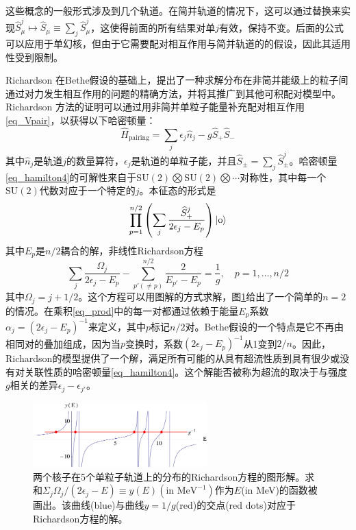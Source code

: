 这些概念的一般形式涉及到几个轨道。在简并轨道的情况下，这可以通过替换来实现$\widehat{S}_\mu^j\mapsto\widehat{S}_\mu\equiv\sum_j\widehat{S}^j_\mu$，这使得前面的所有结果对单$j$有效，保持不变。后面的公式可以应用于单幻核，但由于它需要配对相互作用与简并轨道的的假设，因此其适用性受到限制。

Richardson 在Bethe假设的基础上，提出了一种求解分布在非简并能级上的粒子间通过对力发生相互作用的问题的精确方法，并将其推广到其他可积配对模型中。Richardson 方法的证明可以通过用非简并单粒子能量补充配对相互作用\ref{eq_Vpair}，以获得以下哈密顿量：
\begin{equation}\label{eq_hamilton4}
\widehat{H}_\textrm{pairing}=\sum_j\epsilon_j\widehat{n}_j-g\widehat{S}_+\widehat{S}_-
\end{equation}
其中$\widehat{n}_j$是轨道$j$的数量算符，$\epsilon_j$是轨道的单粒子能，并且$\widehat{S}_\pm=\sum_j\widehat{S}^j_\pm$。哈密顿量\ref{eq_hamilton4}的可解性来自于$\textrm{SU}(2)\bigotimes\textrm{SU}(2)\bigotimes\cdots$对称性，其中每一个$\textrm{SU}(2)$代数对应于一个特定的$j$。本征态的形式是
\begin{equation}\label{eq_prod}
\prod_{p=1}^{n/2}\left(\sum_j\frac{\widehat{S}_+^j}{2\epsilon_j-E_p}\right)|{\rm o}\rangle
\end{equation}
其中$E_p$是$n/2$耦合的解，非线性Richardson方程
\begin{equation}
\sum_j\frac{\Omega_j}{2\epsilon_j-E_p}-\sum_{p'(\ne p)}^{n/2}\frac{2}{E_{p'}-E_p}=\frac{1}{g},\quad p=1,\ldots,n/2
\end{equation}
其中$\Omega_j=j+1/2$。这个方程可以用图解的方式求解，图\ref{F_richardson}给出了一个简单的$n=2$的情况。在乘积\ref{eq_prod}中的每一对都通过依赖于能量$E_p$系数$\alpha_j=(2\epsilon_j-E_p)^{-1}$来定义，其中$p$标记$n/2$对。Bethe假设的一个特点是它不再由相同对的叠加组成，因为当$p$变换时，系数$(2\epsilon_j-E_p)^{-1}$从1变到$2/n$。因此，Richardson的模型提供了一个解，满足所有可能的从具有超流性质到具有很少或没有对关联性质的哈密顿量\ref{eq_hamilton4}。这个解能否被称为超流的取决于与强度$g$相关的差异$\epsilon_j-\epsilon_{j'}$。
\begin{figure}[H]
\centering
\includegraphics[width=0.6\textwidth]{figure/F_richardson.png}
\caption{两个核子在5个单粒子轨道上的分布的Richardson方程的图形解。求和$\Sigma_j\Omega_j/(2\epsilon_j-E)\equiv y(E)(\textrm{in MeV}^{-1})$作为$E$(in MeV)的函数被画出。该曲线(blue)与曲线${y=1/g}$(red)的交点(red dots)对应于Richardson方程的解。\label{F_richardson}}
\end{figure}


